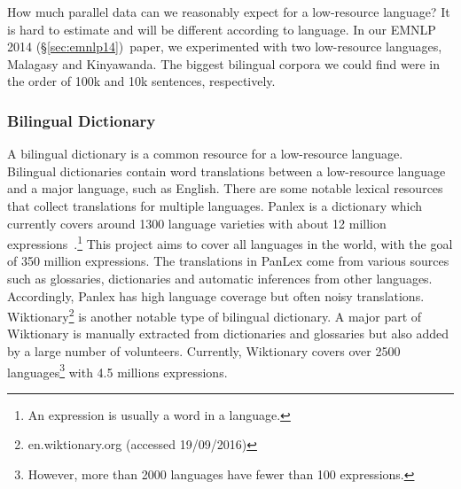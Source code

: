 \documentclass[12pt,twoside,final,hidelinks]{ltthesis}
\theoremstyle{definition}
\newcommand\emnlpiv{EMNLP 2014 (\S\ref{sec:emnlp14})}
\begin{document}
How much parallel data can we reasonably expect for a low-resource language? It is hard to 
estimate and will be different according to language. 
In our \emnlpiv\ paper, 
we experimented with two low-resource languages, Malagasy and Kinyawanda. The biggest bilingual 
corpora we could find were in the order of 100k and 10k sentences, respectively.

\subsubsection{Bilingual Dictionary}
A bilingual dictionary is a common resource for a low-resource language. %
Bilingual dictionaries contain word translations between a low-resource language and a major language, such as English. 
There are some notable lexical resources that collect translations for multiple languages. 
Panlex is a dictionary which currently covers around 1300 language varieties with about 12 million expressions~\cite{Kamholz14}.\footnote{An expression is usually a word in a language.} This project aims to cover all languages in the world, with the goal of 350 million expressions. 
The translations in PanLex come from various sources such as glossaries, dictionaries and automatic inferences from other languages. 
Accordingly, Panlex has high language coverage but often noisy translations.
Wiktionary\footnote{en.wiktionary.org (accessed 19/09/2016)} is another notable type of bilingual dictionary. A major part of Wiktionary 
is manually extracted from dictionaries and glossaries but also added by 
a large number of volunteers. Currently, Wiktionary covers over 2500 languages\footnote{However, more than 2000 languages have fewer than 100 expressions.} with 4.5 millions expressions. 
\end{document}
